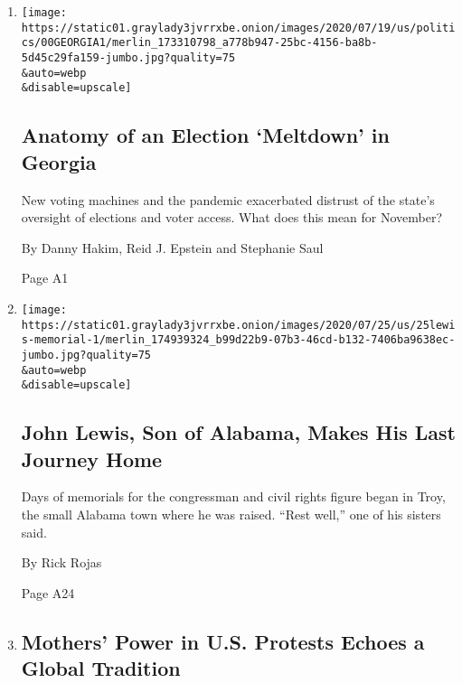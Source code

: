 \begin{enumerate}
\def\labelenumi{\arabic{enumi}.}
\item
  \href{/2020/07/25/us/politics/georgia-election-voting-problems.html}{}

  \texttt{[image: https://static01.graylady3jvrrxbe.onion/images/2020/07/19/us/politics/00GEORGIA1/merlin\_173310798\_a778b947-25bc-4156-ba8b-5d45c29fa159-jumbo.jpg?quality=75\\\&auto=webp\\\&disable=upscale]}

  \hypertarget{anatomy-of-an-election-meltdown-in-georgia}{%
  \subsection{Anatomy of an Election `Meltdown' in
  Georgia}\label{anatomy-of-an-election-meltdown-in-georgia}}

  New voting machines and the pandemic exacerbated distrust of the
  state's oversight of elections and voter access. What does this mean
  for November?

  By Danny Hakim, Reid J. Epstein and Stephanie Saul

  Page A1
\item
  \href{/2020/07/25/us/john-lewis-memorial-service.html}{}

  \texttt{[image: https://static01.graylady3jvrrxbe.onion/images/2020/07/25/us/25lewis-memorial-1/merlin\_174939324\_b99d22b9-07b3-46cd-b132-7406ba9638ec-jumbo.jpg?quality=75\\\&auto=webp\\\&disable=upscale]}

  \hypertarget{john-lewis-son-of-alabama-makes-his-last-journey-home}{%
  \subsection{John Lewis, Son of Alabama, Makes His Last Journey
  Home}\label{john-lewis-son-of-alabama-makes-his-last-journey-home}}

  Days of memorials for the congressman and civil rights figure began in
  Troy, the small Alabama town where he was raised. ``Rest well,'' one
  of his sisters said.

  By Rick Rojas

  Page A24
\item
  \href{/2020/07/25/world/americas/protest-moms-power-police.html}{}

  \hypertarget{mothers-power-in-us-protests-echoes-a-global-tradition}{%
  \subsection{Mothers' Power in U.S. Protests Echoes a Global
  Tradition}\label{mothers-power-in-us-protests-echoes-a-global-tradition}}


\end{enumerate}
